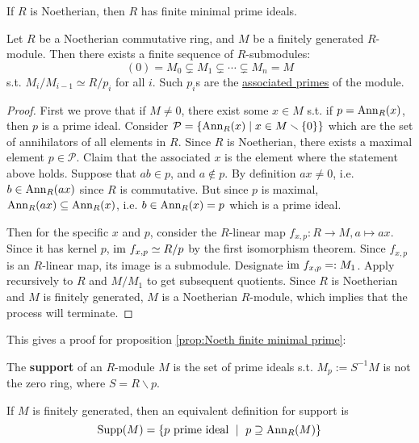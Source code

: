 \documentclass{article}
\begin{document}
\begin{proposition}\label{prop:Noeth finite minimal prime}
    If $R$ is Noetherian, then $R$ has finite minimal prime ideals. 
\end{proposition}

\begin{theorem}\label{thm:associated prime}
    Let $R$ be a Noetherian commutative ring, and $M$ be a finitely generated $R$-module. Then there exists a finite sequence of $R$-submodules:
    \[
        (0) = M_0 \subsetneq M_1 \subsetneq \cdots \subsetneq M_n = M 
    \]
    s.t. $M_i / M_{i-1} \simeq R / p_i$ for all $i$. Such $p_i$s are the \underline{associated primes} of the module.
\end{theorem}

\begin{proof}
    First we prove that if $M\neq 0$, there exist some $x\in M$ s.t. if $p = \mathrm{Ann}_R(x)$, then $p$ is a prime ideal. Consider $\mathcal{P} = \{ \mathrm{Ann}_R(x) \mid x\in M\smallsetminus \{0\} \}$ which are the set of annihilators of all elements in $R$. Since $R$ is Noetherian, there exists a maximal element $p\in\mathcal{P}$. Claim that the associated $x$ is the element where the statement above holds. Suppose that $ab\in p$, and $a\notin p$. By definition $ax \neq 0$, i.e. $b\in \mathrm{Ann}_R(ax)$ since $R$ is commutative. But since $p$ is maximal, $\mathrm{Ann}_R(ax) \subseteq \mathrm{Ann}_R(x)$, i.e. $b\in \mathrm{Ann}_R(x) = p$ which is a prime ideal. 

    Then for the specific $x$ and $p$, consider the $R$-linear map $f_{x, p}: R\to M, a\mapsto ax$. Since it has kernel $p$, $\mathrm{im}\  f_{x, p} \simeq R/p$ by the first isomorphism theorem. Since $f_{x,p}$ is an $R$-linear map, its image is a submodule. Designate $\mathrm{im}\  f_{x, p} =: M_1$. Apply recursively to $R$ and $M/M_1$ to get subsequent quotients. Since $R$ is Noetherian and $M$ is finitely generated, $M$ is a Noetherian $R$-module, which implies that the process will terminate. 
\end{proof}

This gives a proof for proposition \ref{prop:Noeth finite minimal prime}:

\begin{definition}[Support]
    The \textbf{support} of an $R$-module $M$ is the set of prime ideals s.t. $M_p := S^{-1}M$ is not the zero ring, where $S = R \smallsetminus p$.
\end{definition}

\begin{remark}
    If $M$ is finitely generated, then an equivalent definition for support is
    \[
        \Supp (M) = \{ p \text{ prime ideal } \mid\ p\supseteq \Ann_R(M) \}
    \]
\end{remark}
\end{document}
